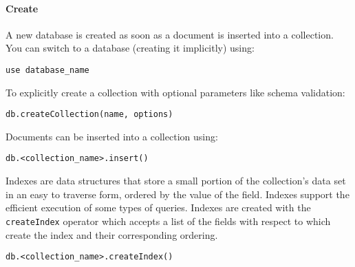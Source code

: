 \paragraph*{Create}
A new database is created as soon as a document is inserted into a collection. 
You can switch to a database (creating it implicitly) using:
\begin{lstlisting}[style=MongoDB]
use database_name
\end{lstlisting}
To explicitly create a collection with optional parameters like schema validation:
\begin{lstlisting}[style=MongoDB]
db.createCollection(name, options)
\end{lstlisting}
Documents can be inserted into a collection using:
\begin{lstlisting}[style=MongoDB]
db.<collection_name>.insert()
\end{lstlisting}
Indexes are data structures that store a small portion of the collection's data set in an easy to traverse form, ordered by the value of the field. 
Indexes support the efficient execution of some types of queries.
Indexes are created with the \texttt{createIndex} operator which accepts a list of the fields with respect to which create the index and their corresponding ordering. 
\begin{lstlisting}[style=MongoDB]
db.<collection_name>.createIndex()
\end{lstlisting}




